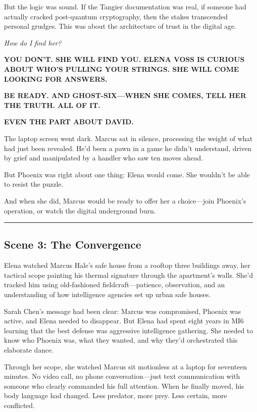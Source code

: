 But the logic was sound. If the Tangier documentation was real, if someone had actually cracked post-quantum cryptography, then the stakes transcended personal grudges. This was about the architecture of trust in the digital age.

\emph{How do I find her?}

\textbf{YOU DON'T. SHE WILL FIND YOU. ELENA VOSS IS CURIOUS ABOUT WHO'S PULLING YOUR STRINGS. SHE WILL COME LOOKING FOR ANSWERS.}

\textbf{BE READY. AND GHOST-SIX---WHEN SHE COMES, TELL HER THE TRUTH. ALL OF IT.}

\textbf{EVEN THE PART ABOUT DAVID.}

The laptop screen went dark. Marcus sat in silence, processing the weight of what had just been revealed. He'd been a pawn in a game he didn't understand, driven by grief and manipulated by a handler who saw ten moves ahead.

But Phoenix was right about one thing: Elena would come. She wouldn't be able to resist the puzzle.

And when she did, Marcus would be ready to offer her a choice---join Phoenix's operation, or watch the digital underground burn.

\begin{center}\rule{0.5\linewidth}{0.5pt}\end{center}

\hypertarget{scene-3-the-convergence}{%
\subsection{Scene 3: The Convergence}\label{scene-3-the-convergence}}

Elena watched Marcus Hale's safe house from a rooftop three buildings away, her tactical scope painting his thermal signature through the apartment's walls. She'd tracked him using old-fashioned fieldcraft---patience, observation, and an understanding of how intelligence agencies set up urban safe houses.

Sarah Chen's message had been clear: Marcus was compromised, Phoenix was active, and Elena needed to disappear. But Elena had spent eight years in MI6 learning that the best defense was aggressive intelligence gathering. She needed to know who Phoenix was, what they wanted, and why they'd orchestrated this elaborate dance.

Through her scope, she watched Marcus sit motionless at a laptop for seventeen minutes. No video call, no phone conversation---just text communication with someone who clearly commanded his full attention. When he finally moved, his body language had changed. Less predator, more prey. Less certain, more conflicted.

